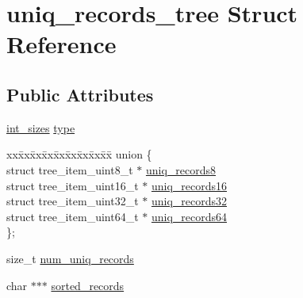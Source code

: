 \hypertarget{structuniq__records__tree}{\section{uniq\-\_\-records\-\_\-tree \-Struct \-Reference}
\label{structuniq__records__tree}
}
\subsection*{\-Public \-Attributes}
\begin{DoxyCompactItemize}
\item 
\hyperlink{grouper__fptr_8c_a510e286db24999375ef3f3ed62367ed0}{int\-\_\-sizes} \hyperlink{structuniq__records__tree_a2bd28ef4c61dd21453af3c5b1bcfae99}{type}
\item 
\begin{tabbing}
xx\=xx\=xx\=xx\=xx\=xx\=xx\=xx\=xx\=\kill
union \{\\
\>struct tree\_item\_uint8\_t $\ast$ \hyperlink{structuniq__records__tree_a62c665f69f3c41cf61d0fb3164bf6bb8}{uniq\_records8}\\
\>struct tree\_item\_uint16\_t $\ast$ \hyperlink{structuniq__records__tree_a9df29b0df41a45e032b92224b454f52e}{uniq\_records16}\\
\>struct tree\_item\_uint32\_t $\ast$ \hyperlink{structuniq__records__tree_a5804158857fe19cae48836378cc109f7}{uniq\_records32}\\
\>struct tree\_item\_uint64\_t $\ast$ \hyperlink{structuniq__records__tree_a6fda0a82a4841a0d9df656535dd0a431}{uniq\_records64}\\
\}; \\

\end{tabbing}\item 
size\-\_\-t \hyperlink{structuniq__records__tree_ad29c48d8c32333c64850922e14f07653}{num\-\_\-uniq\-\_\-records}
\item 
char $\ast$$\ast$$\ast$ \hyperlink{structuniq__records__tree_a540f291b5bca77a28be774fa2bfaa4a7}{sorted\-\_\-records}
\end{DoxyCompactItemize}


